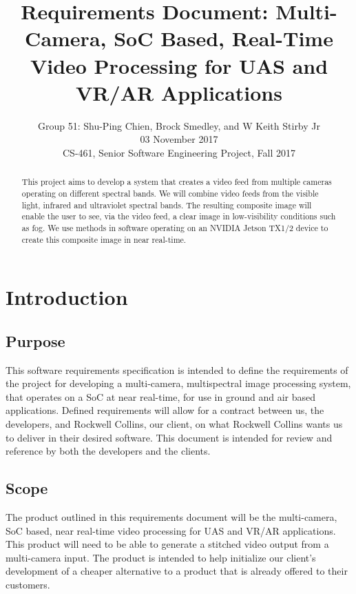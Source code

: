 \documentclass[letterpaper,10pt,serif,draftclsnofoot,onecolumn,compsoc,titlepage]{IEEEtran}
\title{Requirements Document: Multi-Camera, SoC Based, Real-Time Video Processing for UAS and VR/AR Applications}
\author{Group 51: Shu-Ping Chien, Brock Smedley, and W Keith Stirby Jr \\ 03 November 2017 \\ CS-461, Senior Software Engineering Project, Fall 2017}
\begin{document}
\begin{titlepage}
\maketitle
\begin{abstract}

This project aims to develop a system that creates a video feed from multiple cameras 
operating on different spectral bands. We will combine video feeds from the
visible light, infrared and ultraviolet spectral bands. The resulting composite image 
will enable the user to see, via the video feed, a clear image in low-visibility 
conditions such as fog. We use methods in software operating on an NVIDIA Jetson 
TX1/2 device to create this composite image in near real-time.\\


\end{abstract}
\end{titlepage}
\newpage

\tableofcontents
\newpage

\section{Introduction}

\subsection{Purpose}

This software requirements specification is intended to define the requirements of the 
project for developing a multi-camera, multispectral image processing system, that 
operates on a SoC at near real-time, for use in ground and air based 
applications. Defined requirements will allow for a contract between us, the 
developers, and Rockwell Collins, our client, on what Rockwell Collins wants us to 
deliver in their desired software. This document is intended for review and reference 
by both the developers and the clients.\\

\subsection{Scope}

The product outlined in this requirements document will be the multi-camera, SoC based,
 near real-time video processing for UAS and VR/AR applications. This product will need to 
 be able to generate a stitched video output from a multi-camera input. The product is 
 intended to help initialize our client's development of a cheaper alternative to a 
 product that is already offered to their customers.\\
\end{document}
